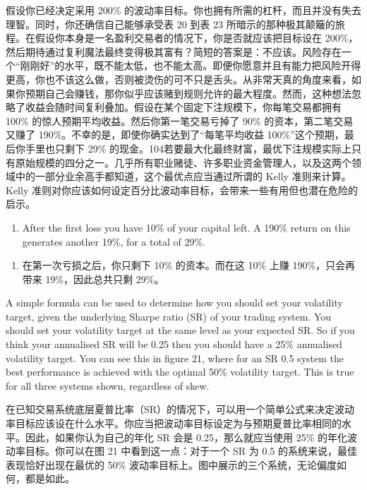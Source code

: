 \begin{chineseblock}假设你已经决定采用 200\% 的波动率目标。你也拥有所需的杠杆，而且并没有失去理智。同时，你还确信自己能够承受表 20 到表 23 所暗示的那种极其颠簸的旅程。在假设你本身是一名盈利交易者的情况下，你是否就应该把目标设在 200\%，然后期待通过复利魔法最终变得极其富有？简短的答案是：不应该。风险存在一个“刚刚好”的水平，既不能太低，也不能太高。即便你愿意并且有能力把风险开得更高，你也不该这么做，否则被烫伤的可不只是舌头。从非常天真的角度来看，如果你预期自己会赚钱，那你似乎应该赌到规则允许的最大程度。然而，这种想法忽略了收益会随时间复利叠加。假设在某个固定下注规模下，你每笔交易都拥有 100\% 的惊人预期平均收益。然后你第一笔交易亏掉了 90\% 的资本，第二笔交易又赚了 190\%。不幸的是，即使你确实达到了“每笔平均收益 100\%”这个预期，最后你手里也只剩下 29\% 的现金。104若要最大化最终财富，最优下注规模实际上只有原始规模的四分之一。几乎所有职业赌徒、许多职业资金管理人，以及这两个领域中的一部分业余高手都知道，这个最优点应当通过所谓的 Kelly 准则来计算。Kelly 准则对你应该如何设定百分比波动率目标，会带来一些有用但也潜在危险的启示。\end{chineseblock}

\begin{enumerate}
\item After the first loss you have 10\% of your capital left. A 190\% return on this generates another 19\%, for a total of 29\%. \end{enumerate}

\begin{enumerate}
\item 在第一次亏损之后，你只剩下 10\% 的资本。而在这 10\% 上赚 190\%，只会再带来 19\%，因此总共只剩 29\%。 \end{enumerate}

\begin{englishblock} A simple formula can be used to determine how you should set your volatility target, given the underlying Sharpe ratio (SR) of your trading system. You should set your volatility target at the same level as your expected SR. So if you think your annualised SR will be 0.25 then you should have a 25\% annualised volatility target. You can see this in figure 21, where for an SR 0.5 system the best performance is achieved with the optimal 50\% volatility target. This is true for all three systems shown, regardless of skew. \end{englishblock}

\begin{chineseblock}在已知交易系统底层夏普比率（SR）的情况下，可以用一个简单公式来决定波动率目标应该设在什么水平。你应当把波动率目标设定为与预期夏普比率相同的水平。因此，如果你认为自己的年化 SR 会是 0.25，那么就应当使用 25\% 的年化波动率目标。你可以在图 21 中看到这一点：对于一个 SR 为 0.5 的系统来说，最佳表现恰好出现在最优的 50\% 波动率目标上。图中展示的三个系统，无论偏度如何，都是如此。\end{chineseblock}


